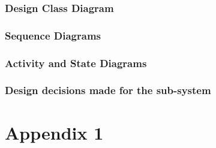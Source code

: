 \documentclass[a4paper, 11pt, oneside]{report}
\begin{document}
\subsection{Design Class Diagram}
\label{DetailedDesign:WirelessSimulatie:class}
\subsection{Sequence Diagrams}
\label{DetailedDesign:WirelessSimulatie:sequence}
\subsection{Activity and State Diagrams}
\label{DetailedDesign:WirelessSimulatie:activity}
\subsection{Design decisions made for the sub-system}
\label{DetailedDesign:WirelessSimulatie:decisions}





\clearpage
\appendix
\chapter{Appendix 1}
\label{app:iteratieplan}
\end{document}
